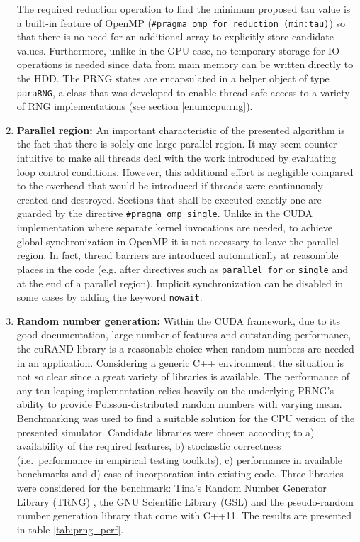 \begin{enumerate}
The required reduction operation to find the minimum proposed tau value is a built-in feature of OpenMP (\texttt{\#pragma omp for reduction (min:tau)}) so that there is no need for an additional array to explicitly store candidate values. Furthermore, unlike in the GPU case, no temporary storage for IO operations is needed since data from main memory can be written directly to the HDD. The PRNG states are encapsulated in a helper object of type \texttt{paraRNG}, a class that was developed to enable thread-safe access to a variety of RNG implementations (see section \ref{enum:cpu:rng}). 
\item \textbf{Parallel region:} An important characteristic of the presented algorithm is the fact that there is solely one large parallel region. It may seem counter-intuitive to make all threads deal with the work introduced by evaluating loop control conditions. However, this additional effort is negligible compared to the overhead that would be introduced if threads were continuously created and destroyed. Sections that shall be executed exactly one are guarded by the directive \texttt{\#pragma omp single}. Unlike in the CUDA implementation where separate kernel invocations are needed, to achieve global synchronization in OpenMP it is not necessary to leave the parallel region. In fact, thread barriers are introduced automatically at reasonable places in the code (e.g. after directives such as \texttt{parallel for} or \texttt{single} and at the end of a parallel region). Implicit synchronization can be disabled in some cases by adding the keyword \texttt{nowait}. 
\item \textbf{Random number generation:} 
\label{enum:cpu:rng}
Within the CUDA framework, due to its good documentation, large number of features and outstanding performance, the cuRAND library is a reasonable choice when random numbers are needed in an application. Considering a generic C++ environment, the situation is not so clear since a great variety of libraries is available. The performance of any tau-leaping implementation relies heavily on the underlying PRNG's ability to provide Poisson-distributed random numbers with varying mean. Benchmarking was used to find a suitable solution for the CPU version of the presented simulator. Candidate libraries were chosen according to a) availability of the required features, b) stochastic correctness (i.e.\ performance in empirical testing toolkits), c) performance in available benchmarks and d) ease of incorporation into existing code. Three libraries were considered for the benchmark: Tina's Random Number Generator Library (TRNG) \cite{bauke_tinas_????}, the GNU Scientific Library (GSL) \cite{gough_gnu_2009} and the pseudo-random number generation library that come with C++11. The results are presented in table \ref{tab:prng_perf}. 


\end{enumerate}
